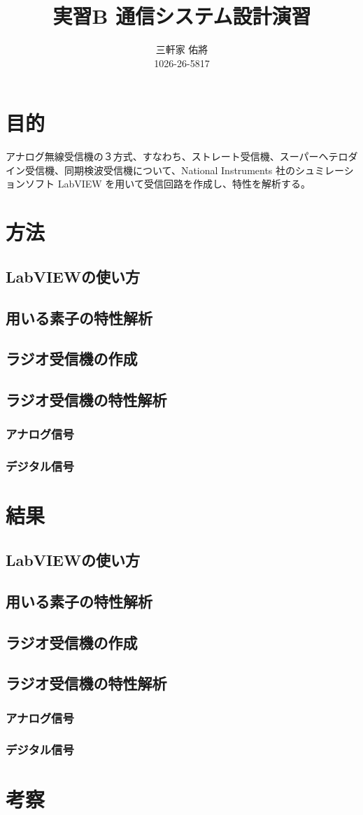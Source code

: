 \documentclass[11pt]{ujarticle}
\title{実習B 通信システム設計演習}
\author{三軒家 佑將 \\ 1026-26-5817}
\date{}
\begin{document}
\maketitle

\section{目的}
	アナログ無線受信機の３方式、すなわち、ストレート受信機、スーパーヘテロダイン受信機、同期検波受信機について、National Instruments 社のシュミレーションソフト LabVIEW を用いて受信回路を作成し、特性を解析する。
\section{方法}
	\subsection{LabVIEWの使い方}
	\subsection{用いる素子の特性解析}
	\subsection{ラジオ受信機の作成}
	\subsection{ラジオ受信機の特性解析}
		\subsubsection{アナログ信号}
		\subsubsection{デジタル信号}
\section{結果} %
	\subsection{LabVIEWの使い方}
	\subsection{用いる素子の特性解析}
	\subsection{ラジオ受信機の作成}
	\subsection{ラジオ受信機の特性解析}
		\subsubsection{アナログ信号}
		\subsubsection{デジタル信号}
\section{考察} %
\end{document}
